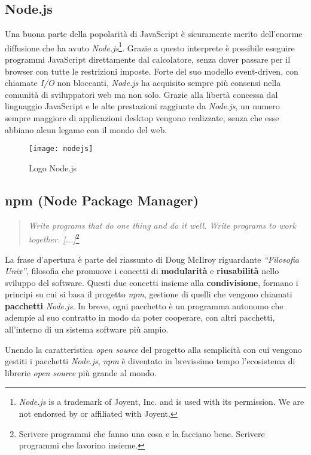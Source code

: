 \subsection{Node.js}
Una buona parte della popolarità di JavaScript è sicuramente merito dell'enorme
diffusione che ha avuto \textit{Node.js}\footnote{\textit{Node.js} is a
trademark of Joyent, Inc. and is used with its permission. We are not endorsed
by or affiliated with Joyent.}. Grazie a questo interprete è possibile eseguire
programmi JavaScript direttamente dal calcolatore, senza dover passare per il
browser con tutte le restrizioni imposte. Forte del suo modello
\gls{event-driven}, con chiamate \textit{I/O} non bloccanti, \textit{Node.js}
ha acquisito sempre più consensi nella comunità di sviluppatori web ma non solo.
Grazie alla libertà concessa dal linguaggio JavaScript e le alte prestazioni
raggiunte da \textit{Node.js}, un numero sempre maggiore di applicazioni desktop
vengono realizzate, senza che esse abbiano alcun legame con il mondo del web.

\begin{figure}[h]
\begin{center}
\texttt{[image: nodejs]}
\caption{Logo Node.js}
\label{fig:nodejs_logo}
\end{center}
\end{figure}

\subsection{npm (Node Package Manager)}
\begin{quote}
\textit{Write programs that do one thing and do it well. Write programs to work
together. [...]}\footnote{Scrivere programmi che fanno una cosa e la facciano
bene. Scrivere programmi che lavorino insieme.}
\end{quote}

La frase d'apertura è parte del riassunto di Doug McIlroy riguardante
\textit{``Filosofia Unix''}, filosofia che promuove i concetti di
\textbf{modularità} e \textbf{riusabilità} nello sviluppo del software. Questi
due concetti insieme alla \textbf{condivisione}, formano i principi su cui si
basa il progetto \textit{npm}, gestione di quelli che vengono chiamati
\textbf{pacchetti} \textit{Node.js}. In breve, ogni pacchetto è un programma
autonomo che adempie al suo \gls{contratto} in modo da poter cooperare, con
altri pacchetti, all'interno di un sistema software più ampio.

Unendo la caratteristica \textit{open source} del progetto alla semplicità con
cui vengono gestiti i pacchetti \textit{Node.js}, \textit{npm} è diventato in
brevissimo tempo l'ecosistema di librerie \textit{open source} più grande al
mondo.

